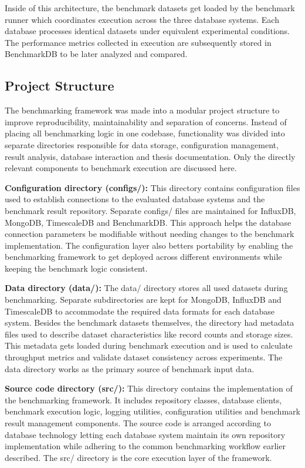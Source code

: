 Inside of this architecture, the benchmark datasets get loaded by the benchmark runner which coordinates execution across the three database systems. Each database processes identical datasets under equivalent experimental conditions. The performance metrics collected in execution are subsequently stored in BenchmarkDB to be later analyzed and compared. 



\subsection{Project Structure}
The benchmarking framework was made into a modular project structure to improve reproducibility, maintainability and separation of concerns. Instead of placing all benchmarking logic in one codebase, functionality was divided into separate directories responsible for data storage, configuration management, result analysis, database interaction and thesis documentation. Only the directly relevant components to benchmark execution are discussed here. 

\textbf{Configuration directory (configs/):} 
This directory contains configuration files used to establish connections to the evaluated database systems and the benchmark result repository. Separate configs/ files are maintained for InfluxDB, MongoDB, TimescaleDB and BenchmarkDB. This approach helps the database connection parameters be modifiable without needing changes to the benchmark implementation. The configuration layer also betters portability by enabling the benchmarking framework to get deployed across different environments while keeping the benchmark logic consistent. 


\textbf{Data directory (data/):}
The data/ directory stores all used datasets during benchmarking. Separate subdirectories are kept for MongoDB, InfluxDB and TimescaleDB to accommodate the required data formats for each database system. Besides the benchmark datasets themselves, the directory had metadata files used to describe dataset characteristics like record counts and storage sizes. This metadata gets loaded during benchmark execution and is used to calculate throughput metrics and validate dataset consistency across experiments. The data directory works as the primary source of benchmark input data. 


\textbf{Source code directory (src/):}
This directory contains the implementation of the benchmarking framework. It includes repository classes, database clients, benchmark execution logic, logging utilities, configuration utilities and benchmark result management components. The source code is arranged according to database technology letting each database system maintain its own repository implementation while adhering to the common benchmarking workflow earlier described. The src/ directory is the core execution layer of the framework. 


